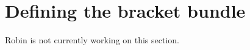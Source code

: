 \documentclass[11pt]{article}
\theoremstyle{definition}
\theoremstyle{remark}
\def\ov#1{\overline{#1}}
\def\R{\mathbb{R}}
\def\D{\mathbb{D}}
\def\tn#1{\textnormal{#1}}
\begin{document}
%
%
%
%


\section{Defining the bracket bundle}

Robin is not currently working on this section.
\end{document}
